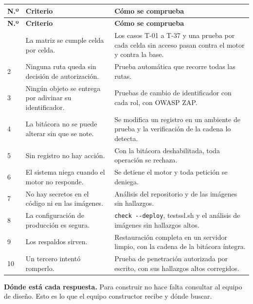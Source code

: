 \documentclass[11pt,letterpaper]{article}
\newcommand{\cab}[1]{\textbf{\rmfamily #1}}
\newcommand{\cod}[1]{\texttt{#1}}
\begin{document}
{\small
\renewcommand{\arraystretch}{1.13}
\begin{longtable}{@{}L{0.7cm} L{8.3cm} L{6.6cm}@{}}
\toprule
\cab{N.º} & \cab{Criterio} & \cab{Cómo se comprueba} \\
\midrule
\endfirsthead
\toprule
\cab{N.º} & \cab{Criterio} & \cab{Cómo se comprueba} \\
\midrule
\endhead
\bottomrule
{} & La matriz se cumple celda por celda. & Los casos T-01 a T-37 y una prueba por cada celda sin acceso pasan contra el motor y contra la base. \\
2 & Ninguna ruta queda sin decisión de autorización. & Prueba automática que recorre todas las rutas. \\
3 & Ningún objeto se entrega por adivinar su identificador. & Pruebas de cambio de identificador con cada rol, con OWASP ZAP. \\
4 & La bitácora no se puede alterar sin que se note. & Se modifica un registro en un ambiente de prueba y la verificación de la cadena lo detecta. \\
5 & Sin registro no hay acción. & Con la bitácora deshabilitada, toda operación se rechaza. \\
6 & El sistema niega cuando el motor no responde. & Se detiene el motor y toda petición se deniega. \\
7 & No hay secretos en el código ni en las imágenes. & Análisis del repositorio y de las imágenes sin hallazgos. \\
8 & La configuración de producción es segura. & \cod{check -{}-deploy}, testssl.sh y el análisis de imágenes sin hallazgos altos. \\
9 & Los respaldos sirven. & Restauración completa en un servidor limpio, con la cadena de la bitácora íntegra. \\
10 & Un tercero intentó romperlo. & Prueba de penetración autorizada por escrito, con sus hallazgos altos corregidos. \\
\end{longtable}
}

\textbf{Dónde está cada respuesta.} Para construir no hace falta consultar al equipo de diseño. Esto
es lo que el equipo constructor recibe y dónde buscar.
\end{document}
